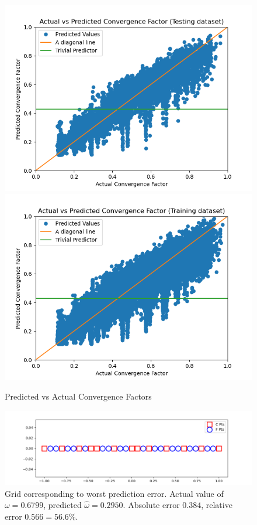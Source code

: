 \begin{figure}[h]
  \centering
  \includegraphics[scale=0.7]{figures/jacobi-conv/conv_test_pred.png}
  \includegraphics[scale=0.7]{figures/jacobi-conv/conv_train_pred.png}
  \caption{Predicted vs Actual Convergence Factors}
  \label{fig:conv_preds}
\end{figure}

\begin{figure}[h]
  \centering
  \includegraphics[scale=0.7]{figures/jacobi-conv/conv_peak_worst_err.png}
  \caption{Grid corresponding to worst prediction error.  Actual value of $\omega=0.6799$, predicted $\hat{\omega} = 0.2950$.  Absolute error $0.384$, relative error $0.566=56.6\%$.}
  \label{fig:worst}
\end{figure}

